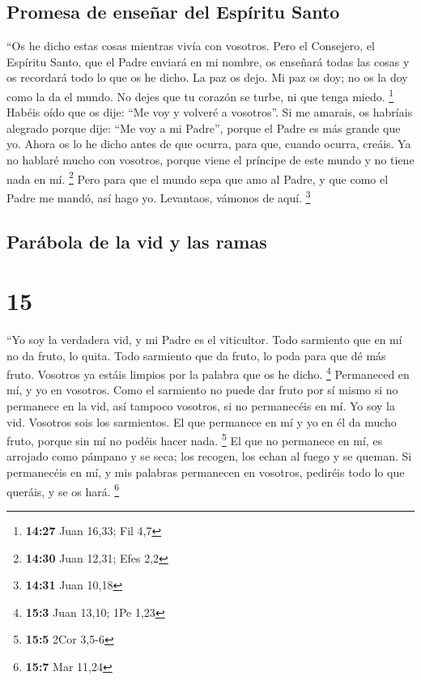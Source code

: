 \hypertarget{promesa-de-enseuxf1ar-del-espuxedritu-santo}{%
\subsection{Promesa de enseñar del Espíritu
Santo}\label{promesa-de-enseuxf1ar-del-espuxedritu-santo}}

 ``Os he dicho estas cosas mientras vivía con vosotros.
 Pero el Consejero, el Espíritu Santo, que el Padre
enviará en mi nombre, os enseñará todas las cosas y os recordará todo lo
que os he dicho.  La paz os dejo. Mi paz os doy; no os la
doy como la da el mundo. No dejes que tu corazón se turbe, ni que tenga
miedo. \footnote{\textbf{14:27} Juan 16,33; Fil 4,7} 
Habéis oído que os dije: ``Me voy y volveré a vosotros''. Si me amarais,
os habríais alegrado porque dije: ``Me voy a mi Padre'', porque el Padre
es más grande que yo.  Ahora os lo he dicho antes de que
ocurra, para que, cuando ocurra, creáis.  Ya no hablaré
mucho con vosotros, porque viene el príncipe de este mundo y no tiene
nada en mí. \footnote{\textbf{14:30} Juan 12,31; Efes 2,2}
 Pero para que el mundo sepa que amo al Padre, y que como
el Padre me mandó, así hago yo. Levantaos, vámonos de aquí. \footnote{\textbf{14:31}
  Juan 10,18}

\hypertarget{paruxe1bola-de-la-vid-y-las-ramas}{%
\subsection{Parábola de la vid y las
ramas}\label{paruxe1bola-de-la-vid-y-las-ramas}}

\hypertarget{section-14}{%
\section{15}\label{section-14}}

 ``Yo soy la verdadera vid, y mi Padre es el viticultor.
 Todo sarmiento que en mí no da fruto, lo quita. Todo
sarmiento que da fruto, lo poda para que dé más fruto. 
Vosotros ya estáis limpios por la palabra que os he dicho. \footnote{\textbf{15:3}
  Juan 13,10; 1Pe 1,23}  Permaneced en mí, y yo en
vosotros. Como el sarmiento no puede dar fruto por sí mismo si no
permanece en la vid, así tampoco vosotros, si no permanecéis en mí.
 Yo soy la vid. Vosotros sois los sarmientos. El que
permanece en mí y yo en él da mucho fruto, porque sin mí no podéis hacer
nada. \footnote{\textbf{15:5} 2Cor 3,5-6}  El que no
permanece en mí, es arrojado como pámpano y se seca; los recogen, los
echan al fuego y se queman.  Si permanecéis en mí, y mis
palabras permanecen en vosotros, pediréis todo lo que queráis, y se os
hará. \footnote{\textbf{15:7} Mar 11,24}

